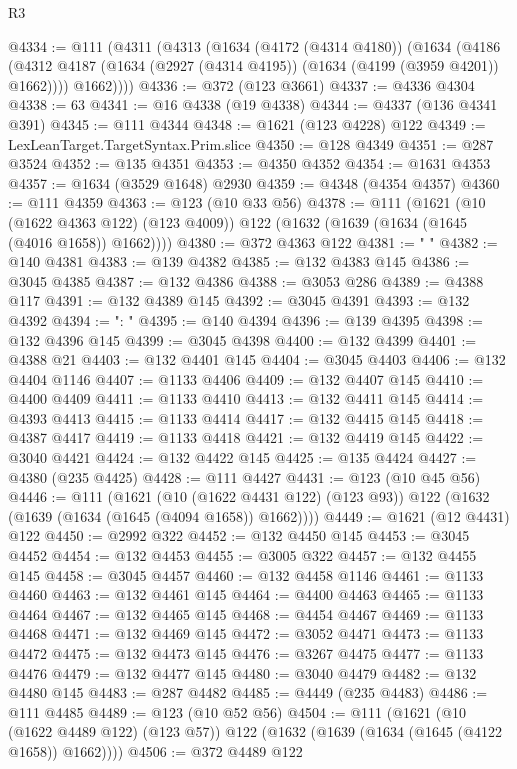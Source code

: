 \begin{lexlean}{R3}
\begin{coremodule}
@4334 := @111
    (@4311
      (@4313
        (@1634
          (@4172 (@4314 @4180))
          (@1634
            (@4186 (@4312 @4187 (@1634 (@2927 (@4314 @4195)) (@1634 (@4199 (@3959 @4201)) @1662))))
            @1662))))
@4336 := @372 (@123 @3661)
@4337 := @4336 @4304
@4338 := 63
@4341 := @16 @4338 (@19 @4338)
@4344 := @4337 (@136 @4341 @391)
@4345 := @111 @4344
@4348 := @1621 (@123 @4228) @122
@4349 := LexLeanTarget.TargetSyntax.Prim.slice
@4350 := @128 @4349
@4351 := @287 @3524
@4352 := @135 @4351
@4353 := @4350 @4352
@4354 := @1631 @4353
@4357 := @1634 (@3529 @1648) @2930
@4359 := @4348 (@4354 @4357)
@4360 := @111 @4359
@4363 := @123 (@10 @33 @56)
@4378 := @111
    (@1621
      (@10 (@1622 @4363 @122) (@123 @4009))
      @122
      (@1632 (@1639 (@1634 (@1645 (@4016 @1658)) @1662))))
@4380 := @372 @4363 @122
@4381 := "      "
@4382 := @140 @4381
@4383 := @139 @4382
@4385 := @132 @4383 @145
@4386 := @3045 @4385
@4387 := @132 @4386
@4388 := @3053 @286
@4389 := @4388 @117
@4391 := @132 @4389 @145
@4392 := @3045 @4391
@4393 := @132 @4392
@4394 := ": "
@4395 := @140 @4394
@4396 := @139 @4395
@4398 := @132 @4396 @145
@4399 := @3045 @4398
@4400 := @132 @4399
@4401 := @4388 @21
@4403 := @132 @4401 @145
@4404 := @3045 @4403
@4406 := @132 @4404 @1146
@4407 := @1133 @4406
@4409 := @132 @4407 @145
@4410 := @4400 @4409
@4411 := @1133 @4410
@4413 := @132 @4411 @145
@4414 := @4393 @4413
@4415 := @1133 @4414
@4417 := @132 @4415 @145
@4418 := @4387 @4417
@4419 := @1133 @4418
@4421 := @132 @4419 @145
@4422 := @3040 @4421
@4424 := @132 @4422 @145
@4425 := @135 @4424
@4427 := @4380 (@235 @4425)
@4428 := @111 @4427
@4431 := @123 (@10 @45 @56)
@4446 := @111
    (@1621
      (@10 (@1622 @4431 @122) (@123 @93))
      @122
      (@1632 (@1639 (@1634 (@1645 (@4094 @1658)) @1662))))
@4449 := @1621 (@12 @4431) @122
@4450 := @2992 @322
@4452 := @132 @4450 @145
@4453 := @3045 @4452
@4454 := @132 @4453
@4455 := @3005 @322
@4457 := @132 @4455 @145
@4458 := @3045 @4457
@4460 := @132 @4458 @1146
@4461 := @1133 @4460
@4463 := @132 @4461 @145
@4464 := @4400 @4463
@4465 := @1133 @4464
@4467 := @132 @4465 @145
@4468 := @4454 @4467
@4469 := @1133 @4468
@4471 := @132 @4469 @145
@4472 := @3052 @4471
@4473 := @1133 @4472
@4475 := @132 @4473 @145
@4476 := @3267 @4475
@4477 := @1133 @4476
@4479 := @132 @4477 @145
@4480 := @3040 @4479
@4482 := @132 @4480 @145
@4483 := @287 @4482
@4485 := @4449 (@235 @4483)
@4486 := @111 @4485
@4489 := @123 (@10 @52 @56)
@4504 := @111
    (@1621
      (@10 (@1622 @4489 @122) (@123 @57))
      @122
      (@1632 (@1639 (@1634 (@1645 (@4122 @1658)) @1662))))
@4506 := @372 @4489 @122

\end{coremodule}
\end{lexlean}
